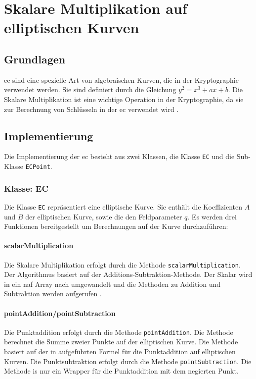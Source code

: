 \chapter{Skalare Multiplikation auf elliptischen Kurven}

\section{Grundlagen}
\gls{ec} sind eine spezielle Art von algebraischen Kurven, die in der Kryptographie verwendet werden. Sie sind definiert durch die Gleichung $y^2 = x^3 + ax + b$. Die Skalare Multiplikation ist eine wichtige Operation in der Kryptographie, da sie zur Berechnung von Schlüsseln in der \gls{ec} verwendet wird \cite{Koblitz1987}.

\section{Implementierung}
Die Implementierung der \gls{ec} besteht aus zwei Klassen, die Klasse \texttt{EC} und die Sub-Klasse \texttt{ECPoint}.

\subsection{Klasse: EC}
Die Klasse \texttt{EC} repräsentiert eine elliptische Kurve. Sie enthält die Koeffizienten $A$ und $B$ der elliptischen Kurve, sowie die den Feldparameter $q$. Es werden drei Funktionen bereitgestellt um Berechnungen auf der Kurve durchzuführen:
\subsubsection{scalarMultiplication}
Die Skalare Multiplikation erfolgt durch die Methode \texttt{scalarMultiplication}. Der Algorithmus basiert auf der Additions-Subtraktion-Methode. Der Skalar wird in ein \gls{naf} Array nach \cite{enwiki:1153415896} umgewandelt und die Methoden zu Addition und Subtraktion werden aufgerufen \cite{891000}.

\subsubsection{pointAddition/pointSubtraction}
Die Punktaddition erfolgt durch die Methode \texttt{pointAddition}. Die Methode berechnet die Summe zweier Punkte auf der elliptischen Kurve. Die Methode basiert auf der in \cite{891000} aufgeführten Formel für die Punktaddition auf elliptischen Kurven. Die Punktsubtraktion erfolgt durch die Methode \texttt{pointSubtraction}. Die Methode is nur ein Wrapper für die Punktaddition mit dem negierten Punkt.

